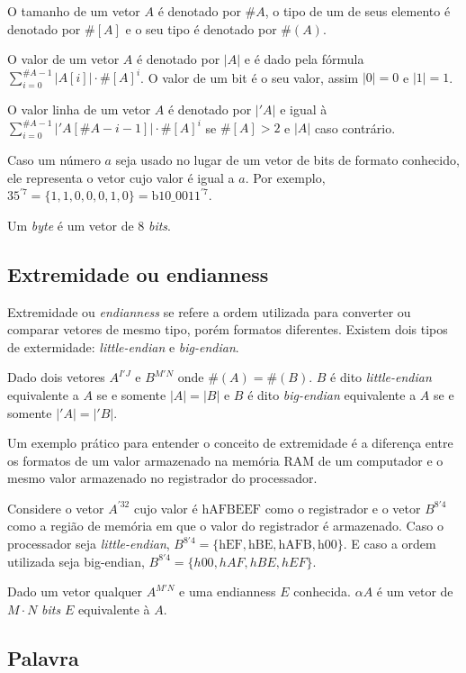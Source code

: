   O tamanho de um vetor $A$ é denotado por $\#A$, o tipo de um de seus elemento é denotado 
  por $\#[A]$ e o seu tipo é denotado por $\#(A)$.

  O valor de um vetor $A$ é denotado por $|A|$ e é dado pela fórmula $\sum_{i =0}^{\#A-1}
  |A[i]| \cdot \#[A]^i$. O valor de um bit é o seu valor, assim $|0| = 0$ e $|1| = 1$.

  O valor linha de um vetor $A$ é denotado por $|'A|$ e igual à $\sum_{i =0}^{\#A-1}
  |'A[\#A -i -1]| \cdot \#[A]^i$ se $\#[A] > 2$ e  $|A|$ caso contrário.

  Caso um número $a$ seja usado no lugar de um vetor de bits de formato conhecido, 
  ele representa o vetor cujo valor é igual a $a$. Por exemplo, $35^{'7} = \{1,1,0,0,0,1,0\}
  = \text{b}10\_0011^{'7}$.

  Um \emph{byte} é um vetor de 8 \emph{bits}.

\subsection{Extremidade ou endianness}
\label{sec:endianness}

  Extremidade ou \emph{endianness} se refere a ordem utilizada para converter ou comparar 
  vetores de mesmo tipo, porém formatos diferentes. Existem dois tipos de extermidade:
  \emph{little-endian} e \emph{big-endian}.

  Dado dois vetores $A^{I'J}$ e $B^{M'N}$ onde $\#(A) = \#(B)$. $B$ é dito \emph{little-endian} 
  equivalente a $A$ se e somente $|A| = |B|$ e $B$ é dito \emph{big-endian} equivalente a $A$
  se e somente $|'A| = |'B|$.

  Um exemplo prático para entender o conceito de extremidade é a diferença entre os formatos
  de um valor armazenado na memória RAM de um computador e o mesmo valor armazenado no registrador
  do processador.

  Considere o vetor $A^{'32}$ cujo valor é $\text{hAFBEEF}$ como o registrador e o vetor $B^{8'4}$
  como a região de memória em que o valor do registrador é armazenado. Caso o processador seja 
  \emph{little-endian},  $B^{8'4} = \{ \text{hEF}, \text{hBE}, \text{hAFB}, \text{h}00 \}$. 
  E caso a ordem utilizada seja big-endian,  $B^{8'4} = \{ h00, hAF, hBE, hEF \}$.

  Dado um vetor qualquer $A^{M'N}$ e uma endianness $E$ conhecida. $\alpha A$ é um vetor de 
  $M \cdot N$ \emph{bits} $E$ equivalente à $A$.

\subsection{Palavra}
\label{sec:word}

